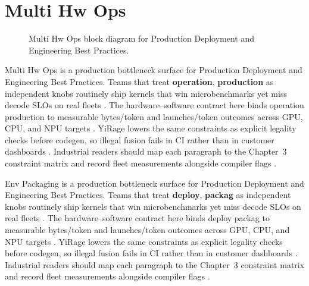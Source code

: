 \section{Multi Hw Ops}
\label{sec:multi_hw_ops}
\begin{figure}[t]
\centering
{}
\caption{Multi Hw Ops block diagram for Production Deployment and Engineering Best Practices.}
\label{fig:multi_hw_ops_architecture}
\end{figure}


Multi Hw Ops is a production bottleneck surface for Production Deployment and Engineering Best Practices. Teams that treat \textbf{operation}, \textbf{production} as independent knobs routinely ship kernels that win microbenchmarks yet miss decode SLOs on real fleets \citep{taxbreak2026,semianalysis2024tma}. The hardware--software contract here binds operation production to measurable bytes/token and launches/token outcomes across GPU, CPU, and NPU targets \citep{memoryfloor2026,amd2024xdna}. YiRage lowers the same constraints as explicit legality checks before codegen, so illegal fusion fails in CI rather than in customer dashboards \citep{nvidia2022hopper,amd2024aie}. Industrial readers should map each paragraph to the Chapter~3 constraint matrix and record fleet measurements alongside compiler flags \citep{semianalysis2024tma,dlbook}.

Env Packaging is a production bottleneck surface for Production Deployment and Engineering Best Practices. Teams that treat \textbf{deploy}, \textbf{packag} as independent knobs routinely ship kernels that win microbenchmarks yet miss decode SLOs on real fleets \citep{liu2024deepseekv3,memoryfloor2026}. The hardware--software contract here binds deploy packag to measurable bytes/token and launches/token outcomes across GPU, CPU, and NPU targets \citep{patel2025llminference,nvidia2022hopper}. YiRage lowers the same constraints as explicit legality checks before codegen, so illegal fusion fails in CI rather than in customer dashboards \citep{taxbreak2026,semianalysis2024tma}. Industrial readers should map each paragraph to the Chapter~3 constraint matrix and record fleet measurements alongside compiler flags \citep{memoryfloor2026,amd2024xdna}.

